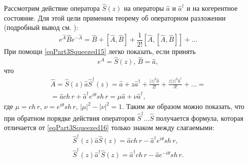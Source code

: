 Рассмотрим действие оператора $\hat{S}\left(z\right)$ на операторы
$\hat{a}$ и $\hat{a}^{\dag}$ и на когерентное состояние. Для этой цели
применим теорему об операторном разложении (подробный вывод
см. ):  
\begin{equation}
e^{\hat{A}}\hat{B}e^{-\hat{A}} = 
\hat{B} + \left[\hat{A},\hat{B}\right] + 
\frac{1}{2!} \left[\hat{A},\left[\hat{A},\hat{B}\right]\right] + \dots
\label{eqPart3Squeezed15}
\end{equation}
При помощи \eqref{eqPart3Squeezed15} легко показать, если принять
\[
e^{\hat{A}} = \hat{S}\left(z\right), \, \hat{B} = \hat{a},
\]
что
\begin{eqnarray}
\hat{A} = \hat{S}\left(z\right)\hat{a}\hat{S}^{\dag}\left(z\right) =
\hat{a} + z \hat{a}^{\dag} + \frac{\left|z\right|^2\hat{a}}{2!} +
\frac{z\left|z\right|^2\hat{a}^{\dag}}{3!} + \dots = 
\nonumber \\
=\hat{a} ch\,r + \hat{a}^{\dag} e^{i\theta} sh \, r = 
\mu \hat{a} + \nu \hat{a}^{\dag},
\label{eqPart3Squeezed16}
\end{eqnarray}
где $\mu = ch\,r$, $\nu = e^{i\theta} sh\,r$, $\left|\mu\right|^2 -
\left|\nu\right|^2  = 1$.
Таким же образом можно показать, что при обратном порядке действия
операторов $\hat{S}^{\dag}\dots\hat{S}$ получается формула, которая
отличается от \eqref{eqPart3Squeezed16} только знаком между
слагаемыми:
\begin{eqnarray}
\hat{S}^{\dag}\left(z\right)\hat{a}\hat{S}\left(z\right) 
=\hat{a} ch\,r - \hat{a}^{\dag} e^{i\theta} sh \, r,
\nonumber \\
\hat{S}^{\dag}\left(z\right)\hat{a}^{\dag}\hat{S}\left(z\right) 
=\hat{a}^{\dag} ch\,r - \hat{a} e^{-i\theta} sh \, r.
\label{eqPart3Squeezed16a}
\end{eqnarray}


